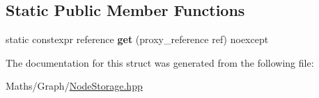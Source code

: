 \subsection*{Static Public Member Functions}
\begin{DoxyCompactItemize}
\item 
\mbox{\label{structsequoia_1_1maths_1_1graph__impl_1_1proxy__dereference__policy_a06f487a92b0c7a4ab0d3f55cb32a6cec}} 
static constexpr reference {\bfseries get} (proxy\+\_\+reference ref) noexcept
\end{DoxyCompactItemize}


The documentation for this struct was generated from the following file\+:\begin{DoxyCompactItemize}
\item 
Maths/\+Graph/\mbox{\hyperlink{_node_storage_8hpp}{Node\+Storage.\+hpp}}\end{DoxyCompactItemize}
